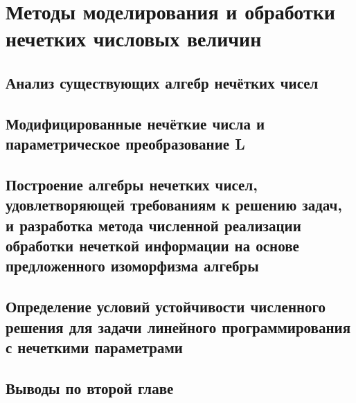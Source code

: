 \chapter{Методы моделирования и обработки нечетких числовых величин}
\label{chapter2}

\section{Анализ существующих алгебр нечётких чисел}
\label{chapter2_1}


\section{Модифицированные нечёткие числа и параметрическое преобразование L}
\label{chapter2_2}


\section{Построение алгебры нечетких чисел, удовлетворяющей требованиям к решению задач, и разработка метода численной реализации обработки нечеткой информации на основе предложенного изоморфизма алгебры} 
\label{chapter2_3}


\section{Определение условий устойчивости численного решения для задачи линейного программирования с нечеткими параметрами} 
\label{chapter2_4}


\section*{Выводы по второй главе} 
\label{chapter2_5}
